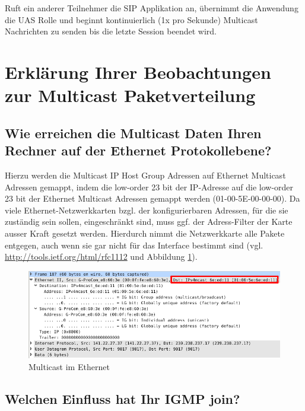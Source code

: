 \documentclass[a4paper,10pt]{article}
\begin{document}
Ruft ein anderer Teilnehmer die SIP Applikation an, übernimmt die Anwendung die UAS Rolle und beginnt kontinuierlich (1x pro Sekunde) Multicast Nachrichten zu senden bis die letzte Session beendet wird.


\section{Erklärung Ihrer Beobachtungen zur Multicast Paketverteilung}

\subsection{Wie erreichen die Multicast Daten Ihren Rechner auf der Ethernet Protokollebene?}

Hierzu werden die Multicast IP Host Group Adressen auf Ethernet Multicast Adressen gemappt,
indem die low-order 23 bit der IP-Adresse auf die low-order 23 bit der Ethernet Multicast Adressen gemappt werden (01-00-5E-00-00-00).
Da viele Ethernet-Netzwerkkarten bzgl. der konfigurierbaren Adressen, für die sie zuständig sein sollen, eingeschränkt sind, muss ggf. der Adress-Filter der Karte ausser Kraft gesetzt werden.
Hierdurch nimmt die Netzwerkkarte alle Pakete entgegen, auch wenn sie gar nicht für das Interface bestimmt sind (vgl. \url{http://tools.ietf.org/html/rfc1112} und Abbildung \ref{multicast_ethernet}).

\begin{figure}[h]
	\begin{center}
		\includegraphics[width=1\textwidth]{multicast_ethernet.png}
	\end{center}

	\caption{Multicast im Ethernet}

	\label{multicast_ethernet}
\end{figure}

\subsection{Welchen Einfluss hat Ihr IGMP join?}
\end{document}
